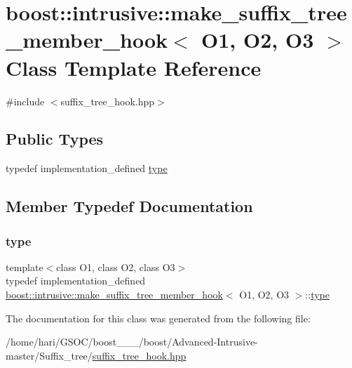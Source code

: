 \hypertarget{classboost_1_1intrusive_1_1make__suffix__tree__member__hook}{}\section{boost\+:\+:intrusive\+:\+:make\+\_\+suffix\+\_\+tree\+\_\+member\+\_\+hook$<$ O1, O2, O3 $>$ Class Template Reference}
\label{classboost_1_1intrusive_1_1make__suffix__tree__member__hook}


{\ttfamily \#include $<$suffix\+\_\+tree\+\_\+hook.\+hpp$>$}

\subsection*{Public Types}
\begin{DoxyCompactItemize}
\item 
typedef implementation\+\_\+defined \hyperlink{classboost_1_1intrusive_1_1make__suffix__tree__member__hook_ad60aeb75c91f8af7d26f667cecb0b8d9}{type}
\end{DoxyCompactItemize}


\subsection{Member Typedef Documentation}
\mbox{\label{classboost_1_1intrusive_1_1make__suffix__tree__member__hook_ad60aeb75c91f8af7d26f667cecb0b8d9}} 
\subsubsection{\texorpdfstring{type}{type}}
{\footnotesize\ttfamily template$<$class O1, class O2, class O3$>$ \\
typedef implementation\+\_\+defined \hyperlink{classboost_1_1intrusive_1_1make__suffix__tree__member__hook}{boost\+::intrusive\+::make\+\_\+suffix\+\_\+tree\+\_\+member\+\_\+hook}$<$ O1, O2, O3 $>$\+::\hyperlink{classboost_1_1intrusive_1_1make__suffix__tree__member__hook_ad60aeb75c91f8af7d26f667cecb0b8d9}{type}}



The documentation for this class was generated from the following file\+:\begin{DoxyCompactItemize}
\item 
/home/hari/\+G\+S\+O\+C/boost\+\_\+\_\+\_/boost/\+Advanced-\/\+Intrusive-\/master/\+Suffix\+\_\+tree/\hyperlink{suffix__tree__hook_8hpp}{suffix\+\_\+tree\+\_\+hook.\+hpp}\end{DoxyCompactItemize}
